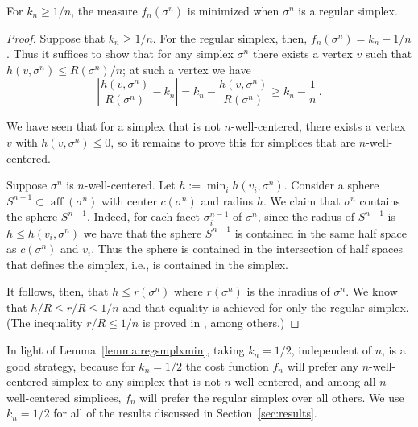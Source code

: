 \documentclass[final]{siamltex}
\DeclareMathOperator{\aff}{aff}
\begin{document}
\begin{lemma}
  For $k_{n} \ge 1/n$, the measure $f_{n}(\sigma^{n})$ is minimized
  when $\sigma^{n}$ is a regular simplex.
\label{lemma:regsmplxmin}
\end{lemma}
\begin{proof}
  Suppose that $k_{n} \ge 1/n$.  For the regular simplex, then,
  $f_{n}(\sigma^{n}) = k_{n} - 1/n$.  Thus it suffices to show
  that for any simplex $\sigma^{n}$ there exists a
  vertex $v$ such that $h(v, \sigma^{n}) \le R(\sigma^{n})/n$;
  at such a vertex we have
  \[
  \left\lvert \frac{h(v, \sigma^{n})}{R(\sigma^{n})} - k_{n}\right\rvert
  = k_{n} - \frac{h(v, \sigma^{n})}{R(\sigma^{n})}
  \ge k_{n} - \frac{1}{n}\,.
  \]
  
  We have seen that for a simplex that is not
  $n$-well-centered, there exists a vertex $v$ with $h(v,\sigma^{n})
  \le 0$, so it remains to prove this for simplices that are
  $n$-well-centered.

  Suppose $\sigma^{n}$ is $n$-well-centered.  Let $h := \min_{i}
  h(v_{i},\sigma^{n}).$ Consider a sphere $S^{n-1} \subset
  \aff(\sigma^{n})$ with center $c(\sigma^{n})$ and radius $h$.  We
  claim that $\sigma^{n}$ contains the sphere $S^{n-1}$.  Indeed, for
  each facet $\sigma^{n-1}_{i}$ of $\sigma^{n}$, since the radius of
  $S^{n-1}$ is $h \le h(v_{i}, \sigma^{n})$ we have that the sphere
  $S^{n-1}$ is contained in the same half space as $c(\sigma^{n})$ and
  $v_{i}$.  Thus the sphere is contained in the intersection of half
  spaces that defines the simplex, i.e., is contained in the simplex.

  It follows, then, that $h \le r(\sigma^{n})$ where $r(\sigma^{n})$
  is the inradius of $\sigma^{n}$.  We know that $h/R \le r/R \le 1/n$
  and that equality is achieved for only the regular simplex.  (The
  inequality $r/R \le 1/n$ is proved in \cite{KlTs1979}, among
  others.)
\end{proof}

\bigskip



In light of Lemma~\ref{lemma:regsmplxmin}, taking $k_{n} = 1/2$,
independent of $n$, is a good strategy, because for $k_{n} = 1/2$ the
cost function $f_{n}$ will prefer any $n$-well-centered simplex to any
simplex that is not $n$-well-centered, and among all $n$-well-centered
simplices, $f_{n}$ will prefer the regular simplex over all others.
We use $k_{n} = 1/2$ for all of the results discussed in
Section~\ref{sec:results}.
\end{document}
